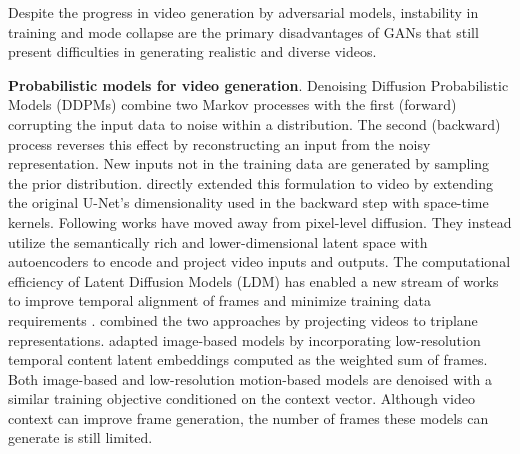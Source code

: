 
Despite the progress in video generation by adversarial models, instability in training and mode collapse are the primary disadvantages of GANs that still present difficulties in generating realistic and diverse videos. 


\noindent
\textbf{Probabilistic models for video generation}. Denoising Diffusion Probabilistic Models (DDPMs) \citep{ho2020denoising,sohl2015deep,song2019generative} combine two Markov processes with the first (forward) corrupting the input data to noise within a distribution. The second (backward) process reverses this effect by reconstructing an input from the noisy representation. New inputs not in the training data are generated by sampling the prior distribution. \citet{ho2022video} directly extended this formulation to video by extending the original U-Net's \citep{salimans2017pixelcnn++} dimensionality used in the backward step with space-time kernels. Following works \citep{he2022latent,hong2022cogvideo,blattmann2023align} have moved away from pixel-level diffusion. They instead utilize the semantically rich and lower-dimensional latent space \citep{rombach2022high} with autoencoders to encode and project video inputs and outputs. The computational efficiency of Latent Diffusion Models (LDM) has enabled a new stream of works to improve temporal alignment of frames \citep{blattmann2023align,yang2023video} and minimize training data requirements \citep{nikankin2023sinfusion,wu2023tune}. \citet{yu2023avideo} combined the two approaches by projecting videos to triplane representations. \citet{yu2024efficient} adapted image-based models by incorporating low-resolution temporal content latent embeddings computed as the weighted sum of frames. Both image-based and low-resolution motion-based models are denoised with a similar training objective conditioned on the context vector. Although video context can improve frame generation, the number of frames these models can generate is still limited. 

